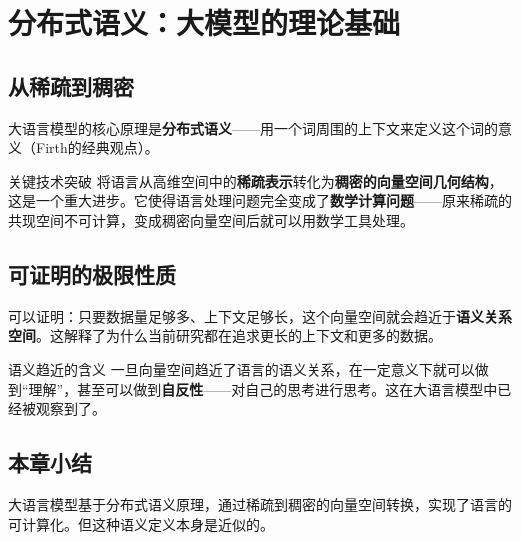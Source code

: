 \section{分布式语义：大模型的理论基础}

\subsection{从稀疏到稠密}

大语言模型的核心原理是\textbf{分布式语义}——用一个词周围的上下文来定义这个词的意义（Firth的经典观点）。

\begin{knowledgebox}{关键技术突破}
将语言从高维空间中的\textbf{稀疏表示}转化为\textbf{稠密的向量空间几何结构}，这是一个重大进步。它使得语言处理问题完全变成了\textbf{数学计算问题}——原来稀疏的共现空间不可计算，变成稠密向量空间后就可以用数学工具处理。
\end{knowledgebox}

\subsection{可证明的极限性质}

可以证明：只要数据量足够多、上下文足够长，这个向量空间就会趋近于\textbf{语义关系空间}。这解释了为什么当前研究都在追求更长的上下文和更多的数据。

\begin{importantbox}{语义趋近的含义}
一旦向量空间趋近了语言的语义关系，在一定意义下就可以做到``理解''，甚至可以做到\textbf{自反性}——对自己的思考进行思考。这在大语言模型中已经被观察到了。
\end{importantbox}

\subsection{本章小结}

大语言模型基于分布式语义原理，通过稀疏到稠密的向量空间转换，实现了语言的可计算化。但这种语义定义本身是近似的。



